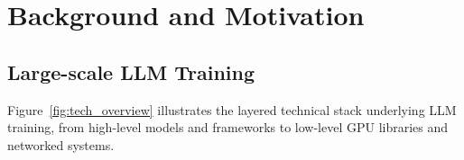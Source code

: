 
\section{Background and Motivation} 
\label{sec:motivation} 

\subsection{Large-scale LLM Training} 
\label{subsec:background}



\noindent Figure~\ref{fig:tech_overview} illustrates the layered technical stack underlying LLM training, from high-level models and frameworks to low-level GPU libraries and networked systems. 


